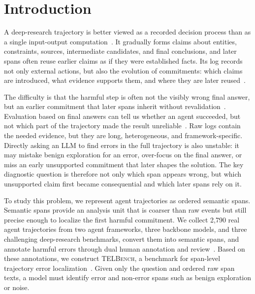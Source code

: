 \section{Introduction}

A deep-research trajectory is better viewed as a recorded decision process than as a single input-output computation~\citep{deshpande2025trailtracereasoningagentic, yao2023reactsynergizingreasoningacting}. It gradually forms claims about entities, constraints, sources, intermediate candidates, and final conclusions, and later spans often reuse earlier claims as if they were established facts. Its log records not only external actions, but also the evolution of commitments: which claims are introduced, what evidence supports them, and where they are later reused~\citep{qin2023toolllm, Kim2025BeyondTF}.

The difficulty is that the harmful step is often not the visibly wrong final answer, but an earlier commitment that later spans inherit without revalidation~\citep{ICLR2024_aca97732,zhang2025agentcausestaskfailures}. Evaluation based on final answers can tell us whether an agent succeeded, but not which part of the trajectory made the result unreliable~\citep{chen2026seeingelephantbenchmarkfailure, NEURIPS2023_cd86a305}. Raw logs contain the needed evidence, but they are long, heterogeneous, and framework-specific. Directly asking an LLM to find errors in the full trajectory is also unstable: it may mistake benign exploration for an error, over-focus on the final answer, or miss an early unsupported commitment that later shapes the solution. The key diagnostic question is therefore not only which span appears wrong, but which unsupported claim first became consequential and which later spans rely on it.

To study this problem, we represent agent trajectories as ordered semantic spans. Semantic spans provide an analysis unit that is coarser than raw events but still precise enough to localize the first harmful commitment. We collect 2,790 real agent trajectories from two agent frameworks, three backbone models, and three challenging deep-research benchmarks, convert them into semantic spans, and annotate harmful errors through dual human annotation and review~\citep{dligach-palmer-2011-reducing, artstein-poesio-2008-survey}. Based on these annotations, we construct \textsc{TELBench}, a benchmark for span-level trajectory error localization~\citep{tyen-etal-2024-llms}. Given only the question and ordered raw span texts, a model must identify error and non-error spans such as benign exploration or noise.

